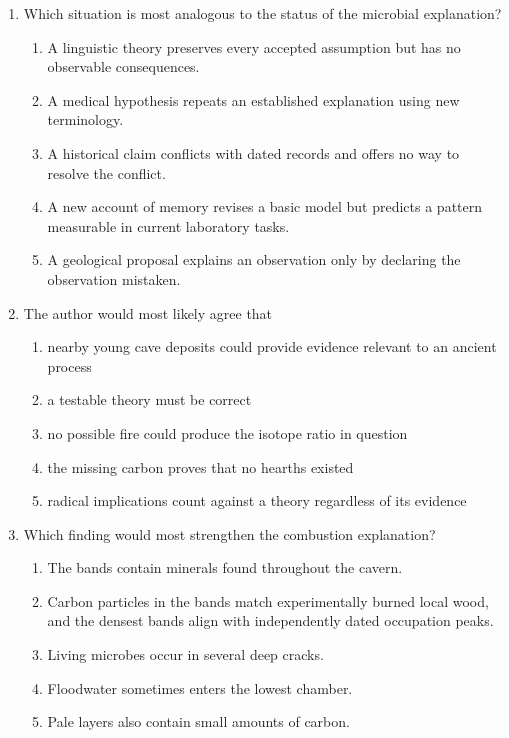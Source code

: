 \begin{enumerate}
\item Which situation is most analogous to the status of the microbial explanation?
\begin{enumerate}
\item A linguistic theory preserves every accepted assumption but has no observable consequences.
\item A medical hypothesis repeats an established explanation using new terminology.
\item A historical claim conflicts with dated records and offers no way to resolve the conflict.
\item A new account of memory revises a basic model but predicts a pattern measurable in current laboratory tasks.
\item A geological proposal explains an observation only by declaring the observation mistaken.
\end{enumerate}

\item The author would most likely agree that
\begin{enumerate}
\item nearby young cave deposits could provide evidence relevant to an ancient process
\item a testable theory must be correct
\item no possible fire could produce the isotope ratio in question
\item the missing carbon proves that no hearths existed
\item radical implications count against a theory regardless of its evidence
\end{enumerate}

\item Which finding would most strengthen the combustion explanation?
\begin{enumerate}
\item The bands contain minerals found throughout the cavern.
\item Carbon particles in the bands match experimentally burned local wood, and the densest bands align with independently dated occupation peaks.
\item Living microbes occur in several deep cracks.
\item Floodwater sometimes enters the lowest chamber.
\item Pale layers also contain small amounts of carbon.
\end{enumerate}
\end{enumerate}

